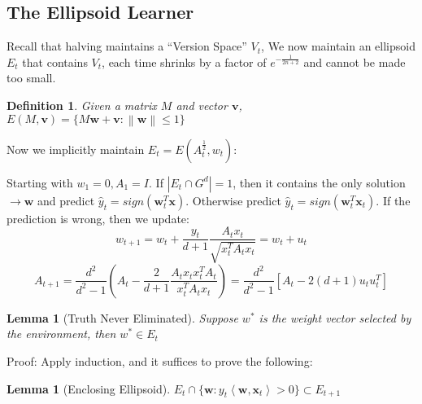 \documentclass{book}
\newcommand{\nm}[1]{\left\|#1\right\|}
\newcommand{\dual}[1]{\left<#1\right>}
\newtheorem{Lemma}[Thm]{Lemma}
\newtheorem{Def}{Definition}[section]
\begin{document}
\subsection{The Ellipsoid Learner}
 Recall that halving maintains a ``Version Space'' $V_{t}$, We now maintain an ellipsoid $E_{t}$ that contains $V_{t}$, each time shrinks by a factor of $e^{-\frac{1}{2n+2}}$ and cannot be made too small.
\begin{Def}
 Given a matrix $M$ and vector $\bm{v}$, $E(M,\bm{v})=\{M\bm{w}+\bm{v}:\nm{\bm{w}}\leq 1 \}$
\end{Def}

Now we implicitly maintain $E_{t}=E(A^{\frac 1 2}_{t},w_{t})$:

Starting with $w_{1}=0, A_{1}=I$. If $|E_{t}\cap G^{d}|=1$, then it contains the only solution$\to \bm{w}$ and predict $\hat y_{t}=sign(\bm{w}_{t}^{T}\bm{x})$. Otherwise predict $\hat y_{t}=sign(\bm w_{t}^{T}\bm x_{t})$. If the prediction is wrong, then we update:
\[w_{t+1}=w_{t}+\frac{y_{t}}{d+1}\frac{A_{t}x_{t}}{\sqrt{x_{t}^{T}A_{t}x_{t}}}=w_{t}+u_{t}\]
\[A_{t+1}=\frac{d^{2}}{d^{2}-1}(A_{t}-\frac{2}{d+1}\frac{A_{t}x_{t}x_{t}^{T}A_{t}}{x^{T}_{t}A_{t}x_{t}})=\frac{d^{2}}{d^{2}-1}[A_{t}-2(d+1)u_{t}u_{t}^{T}]\]

\begin{Lemma}[Truth Never Eliminated]
  Suppose $w^{*}$ is the weight vector selected by the environment, then $w^{*}\in E_{t}$
\end{Lemma}
 Proof: Apply induction, and it suffices to prove the following:
\begin{Lemma}[Enclosing Ellipsoid]
  $E_{t}\cap \{\bm w:y_{t}\dual{\bm w,\bm x_{t}}>0\}\subset E_{t+1}$
\end{Lemma}
\end{document}
